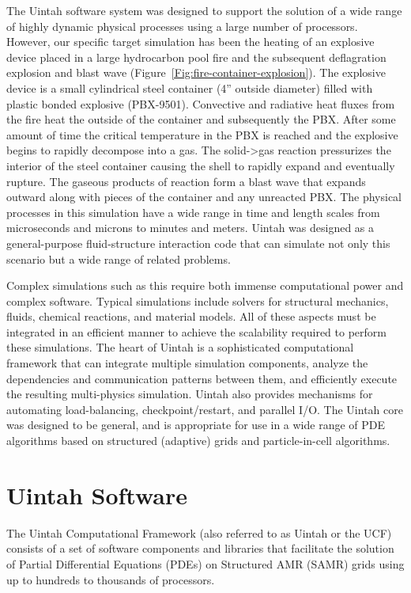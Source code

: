 The Uintah software system was designed to support the solution of a
wide range of highly dynamic physical processes using a large number
of processors.  However, our specific target simulation has been the
heating of an explosive device placed in a large hydrocarbon pool fire
and the subsequent deflagration explosion and blast wave
(Figure~\ref{Fig:fire-container-explosion}). The explosive device is a
small cylindrical steel container (4'' outside diameter) filled with
plastic bonded explosive (PBX-9501). Convective and radiative heat
fluxes from the fire heat the outside of the container and
subsequently the PBX. After some amount of time the critical
temperature in the PBX is reached and the explosive begins to rapidly
decompose into a gas. The solid->gas reaction pressurizes the interior
of the steel container causing the shell to rapidly expand and
eventually rupture. The gaseous products of reaction form a blast wave
that expands outward along with pieces of the container and any
unreacted PBX. The physical processes in this simulation have a wide
range in time and length scales from microseconds and microns to
minutes and meters.  Uintah was designed as a general-purpose
fluid-structure interaction code that can simulate not only this
scenario but a wide range of related problems.

Complex simulations such as this require both immense computational
power and complex software. Typical simulations include solvers for
structural mechanics, fluids, chemical reactions, and material
models. All of these aspects must be integrated in an efficient manner
to achieve the scalability required to perform these simulations. The
heart of Uintah is a sophisticated computational framework that can
integrate multiple simulation components, analyze the dependencies and
communication patterns between them, and efficiently execute the
resulting multi-physics simulation.  Uintah also provides mechanisms
for automating load-balancing, checkpoint/restart, and parallel
I/O. The Uintah core was designed to be general, and is appropriate
for use in a wide range of PDE algorithms based on structured
(adaptive) grids and particle-in-cell algorithms.


\section{Uintah Software}

The Uintah Computational Framework (also referred to as Uintah or the UCF)
consists of a set of software components and libraries that facilitate
the solution of Partial Differential Equations (PDEs) on Structured
AMR (SAMR) grids using up to hundreds to thousands of processors.

